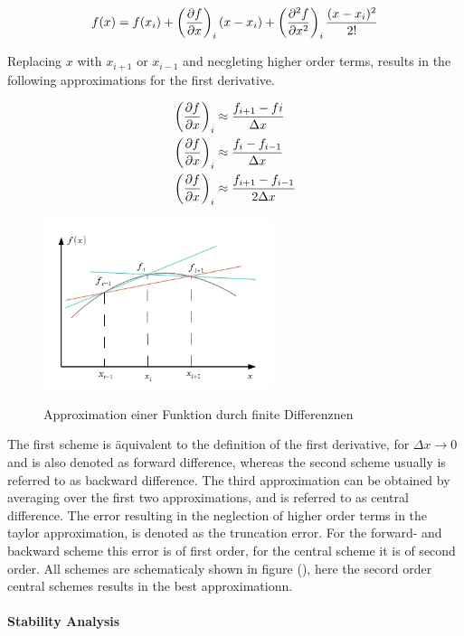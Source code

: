 \begin{align}
    f(x) = f(x_i) + \left(\pdn[f]{x} \right)_i (x - x_i) + \left(\pdn[^2f]{x^2}\right)_i \frac{(x-x_i)^2}{2!}
\end{align}

Replacing $x$ with $x_{i+1}$ or $x_{i-1}$ and necgleting higher order terms, results in the following approximations for the first derivative.

\begin{align}
    \left(\pdn[f]{x}\right)_i &\approx \frac{f_{i+1} - f{i}}{\Delta x}\\
    \left(\pdn[f]{x}\right)_i &\approx \frac{f_{i} - f_{i-1}}{\Delta x}\\
    \left(\pdn[f]{x}\right)_i &\approx \frac{f_{i+1} - f_{i-1}}{2\Delta x}
\end{align}

\begin{figure}[!tpb]
  \centering
  \includegraphics[width=0.6\textwidth]{gfx/numerik/fd_dummy.png}\label{fig:fd_schema}
  \caption{Approximation einer Funktion durch finite Differenznen}
\end{figure}

The first scheme is äquivalent to the definition of the first derivative, for $\Delta x \rightarrow 0$ and is also
denoted as forward difference, whereas the second scheme usually is referred to as backward difference.
The third approximation can be obtained by averaging over the first two approximations, and  is referred to as central difference.
The error resulting in the neglection of higher order terms in the taylor approximation, is denoted as the truncation error.
For the forward- and backward scheme this error is of first order, for the central scheme it is of second order.
All schemes are schematicaly shown in figure (), here the secord order central schemes results in the best approximationn.

\paragraph{Stability Analysis}\mbox{}\\

